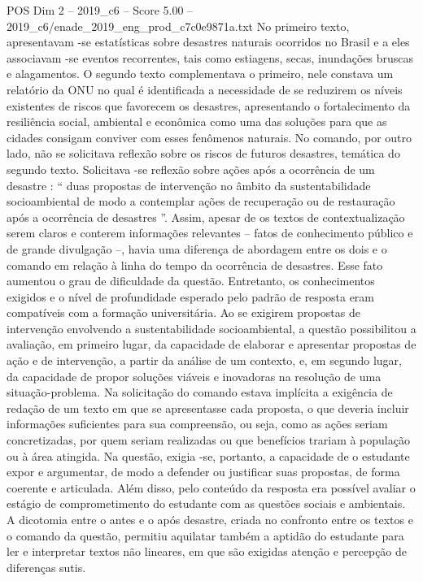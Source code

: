 \begin{textsample}{POS Dim 2 – 2019\_c6 – Score 5.00 – 2019\_c6/enade\_2019\_eng\_prod\_c7c0e9871a.txt}
No primeiro texto, apresentavam -se estatísticas sobre desastres naturais ocorridos no Brasil e a eles associavam -se eventos recorrentes, tais como estiagens, secas, inundações bruscas e alagamentos.
O segundo texto complementava o primeiro, nele constava um relatório da ONU no qual é identificada a necessidade de se reduzirem os níveis existentes de riscos que favorecem os desastres, apresentando o fortalecimento da resiliência social, ambiental e econômica como uma das soluções para que as cidades consigam conviver com esses fenômenos naturais.
No comando, por outro lado, não se solicitava reflexão sobre os riscos de futuros desastres, temática do segundo texto.
Solicitava -se reflexão sobre ações após a ocorrência de um desastre : “ duas propostas de intervenção no âmbito da sustentabilidade socioambiental de modo a contemplar ações de recuperação ou de restauração após a ocorrência de desastres ”.
Assim, apesar de os textos de contextualização serem claros e conterem informações relevantes – fatos de conhecimento público e de grande divulgação –, havia uma diferença de abordagem entre os dois e o comando em relação à linha do tempo da ocorrência de desastres.
Esse fato aumentou o grau de dificuldade da questão.
Entretanto, os conhecimentos exigidos e o nível de profundidade esperado pelo padrão de resposta eram compatíveis com a formação universitária.
Ao se exigirem propostas de intervenção envolvendo a sustentabilidade socioambiental, a questão possibilitou a avaliação, em primeiro lugar, da capacidade de elaborar e apresentar propostas de ação e de intervenção, a partir da análise de um contexto, e, em segundo lugar, da capacidade de propor soluções viáveis e inovadoras na resolução de uma situação-problema.
Na solicitação do comando estava implícita a exigência de redação de um texto em que se apresentasse cada proposta, o que deveria incluir informações suficientes para sua compreensão, ou seja, como as ações seriam concretizadas, por quem seriam realizadas ou que benefícios trariam à população ou à área atingida.
Na questão, exigia -se, portanto, a capacidade de o estudante expor e argumentar, de modo a defender ou justificar suas propostas, de forma coerente e articulada.
Além disso, pelo conteúdo da resposta era possível avaliar o estágio de comprometimento do estudante com as questões sociais e ambientais.
A dicotomia entre o antes e o após desastre, criada no confronto entre os textos e o comando da questão, permitiu aquilatar também a aptidão do estudante para ler e interpretar textos não lineares, em que são exigidas atenção e percepção de diferenças sutis.

\end{textsample}
